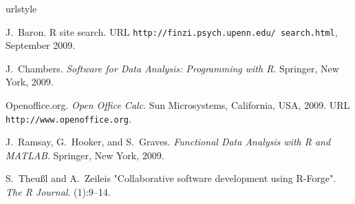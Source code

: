\begin{thebibliography}{6}
\providecommand{\natexlab}[1]{#1}
\providecommand{\url}[1]{\texttt{#1}}
\expandafter\ifx\csname urlstyle\endcsname\relax
  \providecommand{\doi}[1]{doi: #1}\else
  \providecommand{\doi}{doi: \begingroup \urlstyle{rm}\Url}\fi

J.~Baron.
\newblock R site search.
\newblock URL \url{http://finzi.psych.upenn.edu/ search.html}, September 2009.

J.~Chambers.
\newblock \emph{Software for Data Analysis: Programming with R}.
\newblock Springer, New York, 2009.


{Openoffice.org}.
\newblock \emph{Open Office Calc}.
\newblock Sun Microsystems, California, USA, 2009.
\newblock URL \url{http://www.openoffice.org}.

J.~Ramsay, G.~Hooker, and S.~Graves.
\newblock \emph{Functional Data Analysis with R and MATLAB}.
\newblock Springer, New York, 2009.

S.~Theu\ss{}l and A.~Zeileis
\newblock "Collaborative software development using R-Forge".
\newblock \emph{The R Journal}.
(1):9--14.

\end{thebibliography}

\address{Spencer Graves \\
Structure Inspection and Monitoring \\
San Jose, CA} \\

\address{Sundar Dorai-Raj \\
Google \\
Mountain View, CA} \\

\address{Romain Fran\c{c}ois \\
Independent R Consultant \\
Montpellier, France} \\
